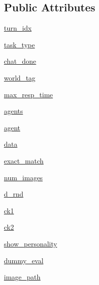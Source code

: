 \subsection*{Public Attributes}
\begin{DoxyCompactItemize}
\item 
\hyperlink{classstack__rank__evals_1_1worlds_1_1MTurkImageChatStackRankWorld_af756cabfda3d8880e7df3fcb95bbed46}{turn\+\_\+idx}
\item 
\hyperlink{classstack__rank__evals_1_1worlds_1_1MTurkImageChatStackRankWorld_a1b31767d9e470d2de96cedec0c570756}{task\+\_\+type}
\item 
\hyperlink{classstack__rank__evals_1_1worlds_1_1MTurkImageChatStackRankWorld_a39dde5ea7b8663db5c02cc1b69702037}{chat\+\_\+done}
\item 
\hyperlink{classstack__rank__evals_1_1worlds_1_1MTurkImageChatStackRankWorld_a7b42699f381f01295b605767127fbc78}{world\+\_\+tag}
\item 
\hyperlink{classstack__rank__evals_1_1worlds_1_1MTurkImageChatStackRankWorld_aa09f0bf20398cab63189d7aa43029cf5}{max\+\_\+resp\+\_\+time}
\item 
\hyperlink{classstack__rank__evals_1_1worlds_1_1MTurkImageChatStackRankWorld_a3c5fb45d68aec332f20317c2364227c7}{agents}
\item 
\hyperlink{classstack__rank__evals_1_1worlds_1_1MTurkImageChatStackRankWorld_a197cd340a59af888ff5028375159c797}{agent}
\item 
\hyperlink{classstack__rank__evals_1_1worlds_1_1MTurkImageChatStackRankWorld_adb7f83fe398250f648deab73161dd0fa}{data}
\item 
\hyperlink{classstack__rank__evals_1_1worlds_1_1MTurkImageChatStackRankWorld_a7f67c53ea887de771ea2a03f54f0454d}{exact\+\_\+match}
\item 
\hyperlink{classstack__rank__evals_1_1worlds_1_1MTurkImageChatStackRankWorld_adf12dbf04b7c2ef32ea7e7c8baacb90d}{num\+\_\+images}
\item 
\hyperlink{classstack__rank__evals_1_1worlds_1_1MTurkImageChatStackRankWorld_a0057390d3473924ac3eca0573a743b5e}{d\+\_\+rnd}
\item 
\hyperlink{classstack__rank__evals_1_1worlds_1_1MTurkImageChatStackRankWorld_a921cd801895dc43a8d3f9abe9302dc00}{ck1}
\item 
\hyperlink{classstack__rank__evals_1_1worlds_1_1MTurkImageChatStackRankWorld_a7ee87a6f1dc19050acd1d62dca67a09b}{ck2}
\item 
\hyperlink{classstack__rank__evals_1_1worlds_1_1MTurkImageChatStackRankWorld_aba6c97cf17975e6ab9dbf997382f47db}{show\+\_\+personality}
\item 
\hyperlink{classstack__rank__evals_1_1worlds_1_1MTurkImageChatStackRankWorld_aac968275c460994fd676c6acf080a818}{dummy\+\_\+eval}
\item 
\hyperlink{classstack__rank__evals_1_1worlds_1_1MTurkImageChatStackRankWorld_ab29ce4a87b80b18e820b97c3f5f991cd}{image\+\_\+path}
\end{DoxyCompactItemize}


